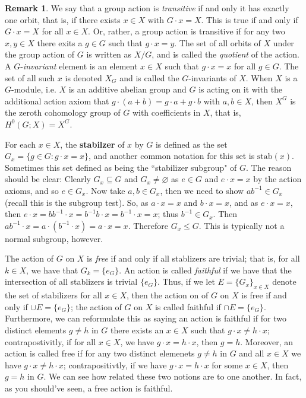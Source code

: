 \documentclass[9pt,reqno]{amsart}
\theoremstyle{definition}
\newtheorem{rem}{Remark}[section]
\begin{document}
\begin{rem}
	We say that a group action is \textit{transitive} if and only it has exactly one orbit, that is, if there exists $x \in X$ with $G \cdot x = X$. This is true if and only if $G \cdot x = X$ for all $x \in X$. Or, rather, a group action is transitive if for any two $x, y \in X$ there exits a $g \in G$ such that $g \cdot x =y$. The set of all orbits of $X$ under the group action of $G$ is written as $X/G$, and is called the \textit{quotient} of the action. A $G$-\textit{invariant} element is an element $x \in X$ such that $g \cdot x = x$ for all $g \in G$. The set of all such $x$ is denoted $X_G$ and is called the $G$-invariants of $X$. When $X$ is a $G$-module, i.e. $X$ is an additive abelian group and $G$ is acting on it with the additional action axiom that $g \cdot (a+b) = g \cdot a + g \cdot b$ with $a, b \in X$, then $X^G$ is the zeroth cohomology group of $G$ with coefficients in $X$, that is, $H^0 (G; X) = X^G$.
	
	For each $x \in X$, the \textbf{stabilzer} of $x$ by $G$ is defined as the set $G_x = \{ g \in G \colon g \cdot x = x \}$, and another common notation for this set is $\text{stab} (x)$. Sometimes this set defined as being the ``stabilizer subgroup" of $G$. The reason should be clear: Clearly $G_x \subseteq G$ and $G_x \neq \varnothing$ as $e \in G $ and $e \cdot x = x$ by the action axioms, and so $e \in G_x$. Now take $a, b \in G_x$, then we need to show $ab^{-1} \in G_x$ (recall this is the subgroup test). So, as $a \cdot x = x $ and $b \cdot x = x$, and as $e \cdot x = x$, then $e \cdot x = bb^{-1} \cdot x = b^{-1} b \cdot x = b^{-1} \cdot x = x$; thus $b^{-1} \in G_x$. Then $ab^{-1} \cdot x = a \cdot (b^{-1} \cdot x) = a \cdot x = x$. Therefore $G_x \leq G$. This is typically not a normal subgroup, however. 
	
	The action of $G$ on $X$ is \textit{free} if and only if all stablizers are trivial; that is, for all $k \in X$, we have that $G_k = \{ e_G \}$. An action is called \textit{faithful} if we have that the intersection of all stablizers is trivial $\{ e_G \}$. Thus, if we let $E = \{G_x \}_{x \in X}$ denote the set of stabilizers for all $x \in X$, then the action on of $G$ on $X$ is free if and only if $\cup E = \{e_G \}$; the action of $G$ on $X$ is called faithful if $\cap E = \{e_G \}$. Furthermore, we can reformulate this as saying an action is faithful if for two distinct elements $g \neq h$ in $G$ there exists an $x \in X$ such that $g \cdot x \neq h \cdot x$; contrapostivitly, if for all $x \in X$, we have $g \cdot x = h \cdot x$, then $g = h$. Moreover, an action is called free if for any two distinct elemenets $g \neq h$ in $G$ and all $x \in X$ we have $g \cdot x \neq h \cdot x$; contrapositivtly, if we have $g \cdot x = h \cdot x$ for some $x \in X$, then $g = h$ in $G$. We can see how related these two notions are to one another. In fact, as you should've seen, a free action is faithful. 
\end{rem}
\end{document}
